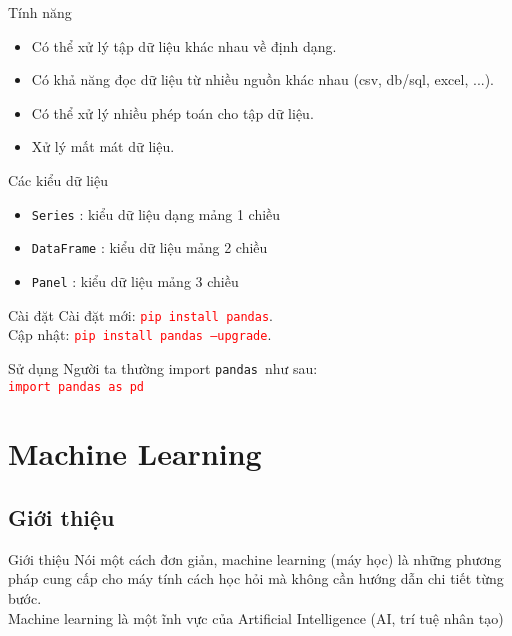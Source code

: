 \documentclass[11pt]{beamer}
\newcommand{\pandas}{\texttt{pandas}}
\begin{document}
		\begin{frame}{Tính năng}
			\begin{itemize}
				\item Có thể xử lý tập dữ liệu khác nhau về định dạng.
				\item Có khả năng đọc dữ liệu từ nhiều nguồn khác nhau (csv, db/sql, excel, ...).
				\item Có thể xử lý nhiều phép toán cho tập dữ liệu.
				\item Xử lý mất mát dữ liệu.
			\end{itemize}
		\end{frame}

	\begin{frame}{Các kiểu dữ liệu}
		\begin{itemize}
			\item \texttt{Series} : kiểu dữ liệu dạng mảng 1 chiều
			\item \texttt{DataFrame} : kiểu dữ liệu mảng 2 chiều
			\item \texttt{Panel} : kiểu dữ liệu mảng 3 chiều
		\end{itemize}
	\end{frame}

	\begin{frame}{Cài đặt}
		Cài đặt mới: \textcolor{red}{\texttt{pip install pandas}}.\\
		Cập nhật: \textcolor{red}{\texttt{pip install pandas --upgrade}}.
	\end{frame}

	\begin{frame}{Sử dụng}
		Người ta thường import \pandas\ như sau:\\
		\centering
		\textcolor{red}{\texttt{import pandas as pd}}
	\end{frame}
	
	\section{Machine Learning}
\subsection{Giới thiệu}
\begin{frame}{Giới thiệu}
Nói một cách đơn giản, machine learning (máy học) là những phương pháp cung cấp cho máy tính cách học hỏi mà không cần hướng dẫn chi tiết từng bước.\\
Machine learning là một ĩnh vực của Artificial Intelligence (AI, trí tuệ nhân tạo)
\end{frame}
\end{document}
